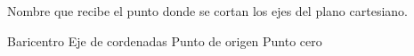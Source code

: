 
\question Nombre que recibe el punto donde se cortan los ejes del plano
          cartesiano.

  \begin{oneparchoices}
    \choice Baricentro
    \choice Eje de cordenadas
    \CorrectChoice Punto de origen
    \choice Punto cero
  \end{oneparchoices}
  \answerline[C]
